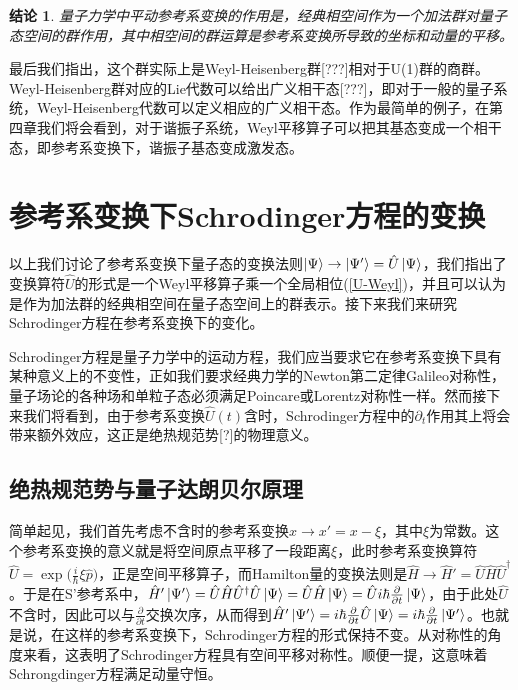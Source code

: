 \documentclass[a4paper]{article}
\newtheorem*{conclusion}{结论}
\begin{document}
        \begin{conclusion}
            量子力学中平动参考系变换的作用是，经典相空间作为一个加法群对量子态空间的群作用，其中相空间的群运算是参考系变换所导致的坐标和动量的平移。
        \end{conclusion}
    
        最后我们指出，这个群实际上是Weyl-Heisenberg群[???]相对于U(1)群的商群。Weyl-Heisenberg群对应的Lie代数可以给出广义相干态[???]，即对于一般的量子系统，Weyl-Heisenberg代数可以定义相应的广义相干态。作为最简单的例子，在第四章我们将会看到，对于谐振子系统，Weyl平移算子可以把其基态变成一个相干态，即参考系变换下，谐振子基态变成激发态。




    \section{参考系变换下Schrodinger方程的变换}

        以上我们讨论了参考系变换下量子态的变换法则$\ket{\Psi}\to\ket{\Psi'}=\hat{U}\ket{\Psi}$，我们指出了变换算符$\hat{U}$的形式是一个Weyl平移算子乘一个全局相位(\ref{U-Weyl})，并且可以认为是作为加法群的经典相空间在量子态空间上的群表示。接下来我们来研究Schrodinger方程在参考系变换下的变化。

        Schrodinger方程是量子力学中的运动方程，我们应当要求它在参考系变换下具有某种意义上的不变性，正如我们要求经典力学的Newton第二定律Galileo对称性，量子场论的各种场和单粒子态必须满足Poincare或Lorentz对称性一样。然而接下来我们将看到，由于参考系变换$\hat{U}(t)$含时，Schrodinger方程中的$\partial_t$作用其上将会带来额外效应，这正是绝热规范势[?]的物理意义。

    \subsection{绝热规范势与量子达朗贝尔原理}

        简单起见，我们首先考虑不含时的参考系变换$x\rightarrow x'=x-\xi$，其中$\xi$为常数。这个参考系变换的意义就是将空间原点平移了一段距离$\xi$，此时参考系变换算符$\hat{U}=\exp\big(\frac{i}{\hbar}\xi\hat{p} \big)$，正是空间平移算子，而Hamilton量的变换法则是$\hat{H}\rightarrow \hat{H}'=\hat{U}\hat{H}\hat{U}^\dagger$。于是在S'参考系中，$\hat{H}'\ket{\Psi'}=\hat{U}\hat{H}\hat{U}^\dagger\hat{U}\ket{\Psi}=\hat{U}\hat{H}\ket{\Psi}=\hat{U} i\hbar\frac{\partial}{\partial t}\ket{\Psi}$，由于此处$\hat{U}$不含时，因此可以与$\frac{\partial}{\partial t}$交换次序，从而得到$\hat{H}'\ket{\Psi'}=i\hbar\frac{\partial}{\partial t}\hat{U}\ket{\Psi}=i\hbar\frac{\partial}{\partial t}\ket{\Psi'}$。也就是说，在这样的参考系变换下，Schrodinger方程的形式保持不变。从对称性的角度来看，这表明了Schrodinger方程具有空间平移对称性。顺便一提，这意味着Schrongdinger方程满足动量守恒。
\end{document}
